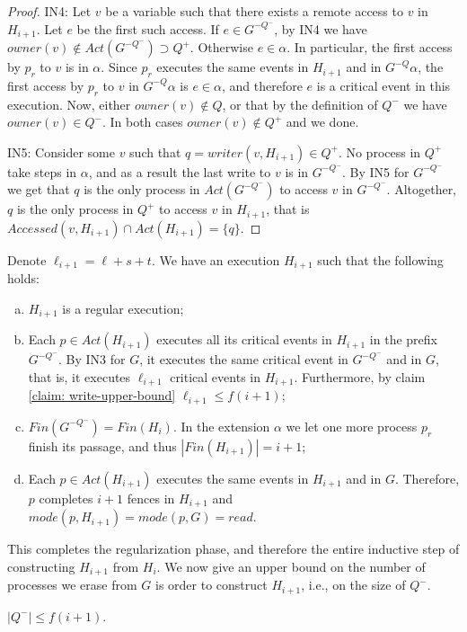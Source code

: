 \begin{proof}
	IN4: Let $v$ be a variable such that there exists a remote access to $v$ in $H_{i+1}$. Let $e$ be the first such access. If $e \in G^{-Q^-}$, by IN4 we have $owner(v) \notin Act(G^{-Q^-}) \supset Q^+$. Otherwise $e \in \alpha$. In particular, the first access by $p_r$ to $v$ is in $\alpha$. Since $p_r$ executes the same events in $H_{i+1}$ and in $G^{-Q} \alpha$, the first access by $p_r$ to $v$ in $G^{-Q} \alpha$ is $e \in \alpha$, and therefore $e$ is a critical event in this execution. Now, either $owner(v) \notin Q$, or that by the definition of $Q^-$ we have $owner(v) \in Q^-$. In both cases $owner(v) \notin Q^+$ and we done.
	
	IN5: Consider some $v$ such that $q = writer(v,H_{i+1}) \in Q^+$. No process in $Q^+$ take steps in $\alpha$, and as a result the last write to $v$ is in $G^{-Q^-}$. By IN5 for $G^{-Q^-}$ we get that $q$ is the only process in $Act(G^{-Q^-})$ to access $v$ in $G^{-Q^-}$. Altogether, $q$ is the only process in $Q^+$ to access $v$ in $H_{i+1}$, that is $Accessed(v,H_{i+1}) \cap Act(H_{i+1}) = \{q\}$.
\end{proof}

Denote $\ell_{i+1} = \ell+s+t$. We have an execution $H_{i+1}$ such that the following holds:
\begin{enumerate}[(a)]
	\item $H_{i+1}$ is a regular execution;
	\item Each $p \in Act(H_{i+1})$ executes all its critical events in $H_{i+1}$ in the prefix $G^{-Q^-}$. By IN3 for $G$, it executes the same critical event in $G^{-Q^-}$ and in $G$, that is, it executes $\ell_{i+1}$ critical events in $H_{i+1}$. Furthermore, by claim \ref{claim: write-upper-bound} $\ell_{i+1} \leq f(i+1)$;
	\item $Fin(G^{-Q^-}) = Fin(H_i)$. In the extension $\alpha$ we let one more process $p_r$ finish its passage, and thus $|Fin(H_{i+1})| = i+1$;
	\item Each $p \in Act(H_{i+1})$ executes the same events in $H_{i+1}$ and in $G$. Therefore, $p$ completes $i+1$ fences in $H_{i+1}$ and $mode(p,H_{i+1}) = mode(p,G) = read$.
\end{enumerate}

This completes the regularization phase, and therefore the entire inductive step of constructing $H_{i+1}$ from $H_i$. We now give an upper bound on the number of processes we erase from $G$ is order to construct $H_{i+1}$, i.e., on the size of $Q^-$.

\begin{claim-subsection} \label{claim: regularization-lower-bound}
	$|Q^-| \leq f(i+1)$.
\end{claim-subsection}

